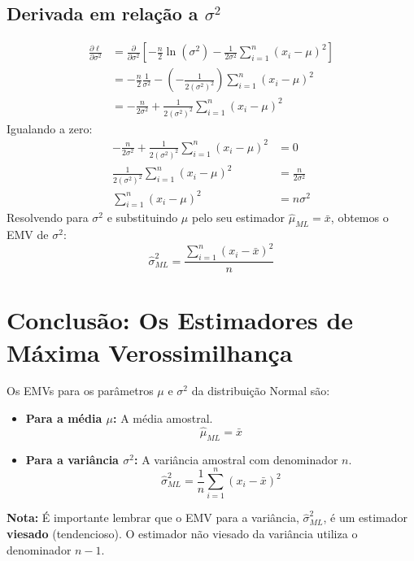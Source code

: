 \subsection{Derivada em relação a \(\sigma^2\)}
\begin{align*}
    \frac{\partial \ell}{\partial \sigma^2} &= \frac{\partial}{\partial \sigma^2} \left[ -\frac{n}{2} \ln(\sigma^2) - \frac{1}{2\sigma^2} \sum_{i=1}^{n} (x_i-\mu)^2 \right] \\
    &= -\frac{n}{2} \frac{1}{\sigma^2} - \left( -\frac{1}{2(\sigma^2)^2} \right) \sum_{i=1}^{n} (x_i-\mu)^2 \\
    &= -\frac{n}{2\sigma^2} + \frac{1}{2(\sigma^2)^2} \sum_{i=1}^{n} (x_i-\mu)^2
\end{align*}
Igualando a zero:
\begin{align*}
    -\frac{n}{2\sigma^2} + \frac{1}{2(\sigma^2)^2} \sum_{i=1}^{n} (x_i-\mu)^2 &= 0 \\
    \frac{1}{2(\sigma^2)^2} \sum_{i=1}^{n} (x_i-\mu)^2 &= \frac{n}{2\sigma^2} \\
    \sum_{i=1}^{n} (x_i-\mu)^2 &= n\sigma^2
\end{align*}
Resolvendo para $\sigma^2$ e substituindo $\mu$ pelo seu estimador $\hat{\mu}_{ML} = \bar{x}$, obtemos o EMV de $\sigma^2$:
\[
\hat{\sigma}^2_{ML} = \frac{\sum_{i=1}^{n} (x_i-\bar{x})^2}{n}
\]

\section{Conclusão: Os Estimadores de Máxima Verossimilhança}
Os EMVs para os parâmetros $\mu$ e $\sigma^2$ da distribuição Normal são:
\begin{itemize}
    \item \textbf{Para a média $\mu$:} A média amostral.
          \[ \hat{\mu}_{ML} = \bar{x} \]
    \item \textbf{Para a variância $\sigma^2$:} A variância amostral com denominador $n$.
          \[ \hat{\sigma}^2_{ML} = \frac{1}{n}\sum_{i=1}^{n} (x_i-\bar{x})^2 \]
\end{itemize}
\textbf{Nota:} É importante lembrar que o EMV para a variância, $\hat{\sigma}^2_{ML}$, é um estimador \textbf{viesado} (tendencioso). O estimador não viesado da variância utiliza o denominador $n-1$.